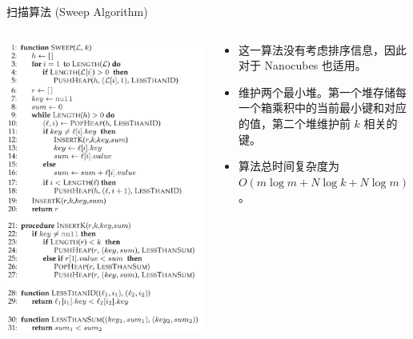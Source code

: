 \documentclass[10pt,aspectratio=169]{beamer}
\begin{document}
\begin{frame}{扫描算法 (Sweep Algorithm)}
    \begin{columns}
        \begin{column}{.3\textwidth}
            \includegraphics[width=\textwidth]{pic/sweep.png}
        \end{column}
        \begin{column}{.7\textwidth}
            \begin{itemize}[<+->]
                \item 这一算法没有考虑排序信息，因此对于 Nanocubes 也适用。
                \item 维护两个最小堆。第一个堆存储每一个箱乘积中的当前最小键和对应的值，第二个堆维护前 $k$ 相关的键。
                \item 算法总时间复杂度为 $O(m \log m + N\log k + N\log m)$。
            \end{itemize}
        \end{column}
    \end{columns}
\end{frame}
\end{document}
